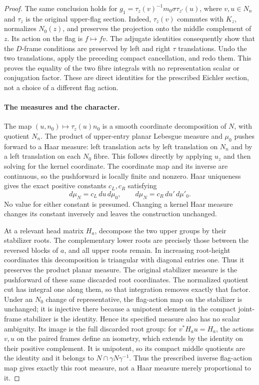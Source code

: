 \begin{proof}
The same conclusion holds for
$g_1=\tau_z(v)^{-1}m_0\sigma\tau_{z'}(u)$, where $v,u\in N_n$
and $\tau_z$ is the original upper-flag section.  Indeed,
$\tau_z(v)$ commutes with $K_z$, normalizes $N_0(z)$, and
preserves the projection onto the middle complement of $z$.
Its action on the flag is $f\mapsto fv$.  The adjugate
identities consequently show that the $D$-frame conditions
are preserved by left and right $\tau$ translations.  Undo
the two translations, apply the preceding compact cancellation,
and redo them.  This proves the equality of the two fibre
integrals with no representation scalar or conjugation factor.
These are direct identities for the prescribed Eichler
section, not a choice of a different flag action.

\paragraph{The measures and the character.}
The map $(u,n_0)\mapsto\tau_z(u)n_0$ is a smooth
coordinate decomposition of $N$, with quotient $N_n$.
The product of upper-entry planar Lebesgue measure and
$\mu_0$ pushes forward to a Haar measure: left translation
acts by left translation on $N_n$ and by a left translation
on each $N_0$ fibre.  This follows directly by applying
$u_z$ and then solving for the kernel coordinate.  The
coordinate map and its inverse are continuous, so the
pushforward is locally finite and nonzero.  Haar uniqueness
gives the exact positive constants $c_L,c_R$ satisfying
\begin{equation}\label{unitary-density-haar-constants}
 d\mu_N=c_L\,d u\,d\mu_0,
 \qquad d\mu_N=c_R\,d u'\,d\mu'_0.
\end{equation}
No value for either constant is presumed.  Changing a kernel
Haar measure changes its constant inversely and leaves the
construction unchanged.

At a relevant head matrix $H_a$, decompose the two upper
groups by their stabilizer roots.  The complementary lower
roots are precisely those between the reversed blocks of
$a$, and all upper roots remain.  In increasing root-height
coordinates this decomposition is triangular with diagonal
entries one.  Thus it preserves the product planar measure.
The original stabilizer measure is the pushforward of these
same discarded root coordinates.  The normalized quotient
cut has integral one along them, so that integration removes
exactly that factor.  Under an $N_0$ change of representative,
the flag-action map on the stabilizer is unchanged; it is
injective there because a unipotent element in the compact
joint-frame stabilizer is the identity.  Hence its specified
measure also has no scalar ambiguity.  Its image is the full
discarded root group: for $v^*H_a u=H_a$, the actions $v,u$ on
the paired frames define an isometry, which extends by the
identity on their positive complement.  It is unipotent, so
its compact middle quotients are the identity and it belongs
to $N\cap\gamma N\gamma^{-1}$.  Thus the prescribed inverse
flag-action map gives exactly this root measure, not a
Haar measure merely proportional to it.


\end{proof}
